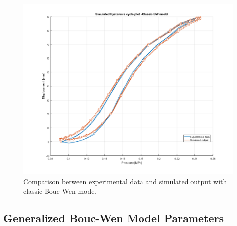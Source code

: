 \begin{figure}[H]
	\centering
	\includegraphics[width=\linewidth]{Images/comparison_classic}
	\caption[Comparison between experimental data and simulated output with classic Bouc-Wen model]{Comparison between experimental data and simulated output with classic Bouc-Wen model}
	\label{fig:comp_classic}
\end{figure}

\subsection{Generalized Bouc-Wen Model Parameters}

